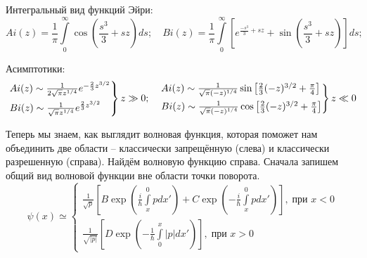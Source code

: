 Интегральный вид функций Эйри:
\[
Ai(z) = \frac{1}{\pi}\int\limits_{0}^{\infty}\cos(\frac{s^3}{3} + sz)ds; \quad Bi(z) = \frac{1}{\pi}\int\limits_{0}^{\infty}\left[e^{\frac{-s^3}{3} + sz} + \sin(\frac{s^3}{3} + sz)\right]ds;
\]

Асимптотики:
\[
\begin{rcases}
    Ai(z) \sim \frac{1}{2\sqrt{\pi}z^{1/4}}e^{-\frac{2}{3}z^{3/2}}\\
    Bi(z) \sim \frac{1}{\sqrt{\pi}z^{1/4}}e^{\frac{2}{3}z^{3/2}}
\end{rcases}
 z \gg 0;\quad
 \begin{rcases}
    Ai(z) \sim \frac{1}{\sqrt{\pi}(-z)^{1/4}}\sin\left[\frac{2}{3}(-z)^{3/2} + \frac{\pi}{4}\right]\\
    Bi(z) \sim \frac{1}{\sqrt{\pi}(-z)^{1/4}}\cos\left[\frac{2}{3}(-z)^{3/2} + \frac{\pi}{4}\right]
\end{rcases}
z\ll 0
\]

Теперь мы знаем, как выглядит волновая функция, которая поможет нам объединить две области -- классически запрещённую (слева) и классически разрешенную (справа). Найдём волновую функцию справа. Сначала запишем общий вид волновой функции вне области точки поворота. 
\[
\psi(x) \simeq
\begin{cases}
    \frac{1}{\sqrt{p}}\left[B\exp\left(\frac{i}{\hbar}\int\limits_x^{0}p dx'\right) + C\exp\left(-\frac{i}{\hbar}\int\limits_x^{0}p dx'\right)\right],\; \text{при } x < 0\\
    \frac{1}{\sqrt{|p|}}\left[D\exp\left(-\frac{1}{\hbar}\int\limits_0^{x}|p| dx'\right)\right],\; \text{при } x > 0
\end{cases}
\]

